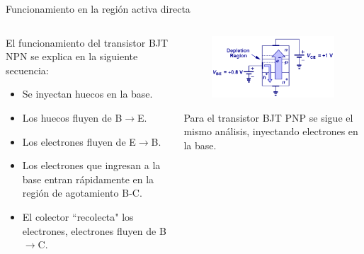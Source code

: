 \documentclass[t,aspectratio=169]{beamer}
\begin{document}
\begin{frame}{Funcionamiento en la región activa directa}
\begin{columns}
\begin{column}{0.5\textwidth}

El funcionamiento del transistor BJT NPN se explica en la siguiente secuencia:

\vspace{5mm}
\begin{itemize}
    \item Se inyectan huecos en la base.
    \item Los huecos fluyen de B$\rightarrow{}$E.
    \item Los electrones fluyen de E$\rightarrow{}$B.
    \item Los electrones que ingresan a la base entran rápidamente en la región de agotamiento B-C.
    \item El colector ``recolecta" los electrones, electrones fluyen de B$\rightarrow{}$C.
\end{itemize}

\end{column}
\begin{column}{0.5\textwidth}

\begin{figure}
    \centering
    \includegraphics[width=\textwidth]{figures/transistor_funcionamiento.png}
\end{figure}

Para el transistor BJT PNP se sigue el mismo análisis, inyectando electrones en la base.

\end{column}
\end{columns}
\end{frame}
\end{document}
